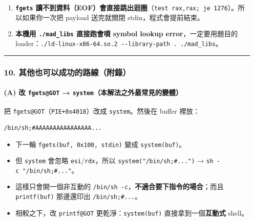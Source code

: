 \documentclass[10pt,a4paper]{article}
\providecommand{\tightlist}{%
  \setlength{\itemsep}{0pt}\setlength{\parskip}{0pt}}
\begin{document}
\begin{enumerate}
  自檢）。
\item
  \textbf{\texttt{fgets}
  讀不到資料（EOF）會直接跳出迴圈}（\texttt{test\ \allowbreak{}rax,\allowbreak{}rax;\ \allowbreak{}je\ \allowbreak{}1276}）。所以如果你一次把
  payload 送完就關閉 stdin，程式會提前結束。
\item
  \textbf{本機用 \texttt{./\allowbreak{}mad\_\allowbreak{}libs} 直接跑會噴 symbol lookup
  error}，一定要用題目的
  loader：\texttt{./\allowbreak{}ld-\allowbreak{}linux-\allowbreak{}x86-\allowbreak{}64.\allowbreak{}so.\allowbreak{}2\ \allowbreak{}-\allowbreak{}\/\allowbreak{}-\allowbreak{}library-\allowbreak{}path\ \allowbreak{}.\allowbreak{}\ \allowbreak{}./\allowbreak{}mad\_\allowbreak{}libs}。
\end{enumerate}

\begin{center}\rule{0.5\linewidth}{0.5pt}\end{center}

\subsubsection{10.
其他也可以成功的路線（附錄）}\label{ux5176ux4ed6ux4e5fux53efux4ee5ux6210ux529fux7684ux8defux7ddaux9644ux9304}

\paragraph{\texorpdfstring{(A) 改 \texttt{fgets@GOT} →
\texttt{system}（本解法之外最常見的變體）}{(A) 改 fgets@GOT → system（本解法之外最常見的變體）}}\label{a-ux6539-fgetsgot-systemux672cux89e3ux6cd5ux4e4bux5916ux6700ux5e38ux898bux7684ux8b8aux9ad4}

把 \texttt{fgets@GOT}（\texttt{PIE+0x4018}）改成 \texttt{system}。然後在
buffer 裡放：

\begin{Verbatim}[breaklines=true,breakanywhere=true,breakautoindent=false,fontsize=\fontsize{7.0}{9.5}\selectfont]
/bin/sh;#AAAAAAAAAAAAAAAA...
\end{Verbatim}

\begin{itemize}
\tightlist
\item
  下一輪 \texttt{fgets(buf,\allowbreak{}\ \allowbreak{}0x100,\allowbreak{}\ \allowbreak{}stdin)} 變成 \texttt{system(buf)}。
\item
  但 \texttt{system} 會忽略 \texttt{esi}/\texttt{rdx}，所以
  \texttt{system("/\allowbreak{}bin/\allowbreak{}sh;\#\allowbreak{}...")} → \texttt{sh\ \allowbreak{}-\allowbreak{}c\ \allowbreak{}"/\allowbreak{}bin/\allowbreak{}sh;\#\allowbreak{}..."}。
\item
  這樣只會開一個非互動的
  \texttt{/\allowbreak{}bin/\allowbreak{}sh\ \allowbreak{}-\allowbreak{}c}，\textbf{不適合要下指令的場合}；而且
  \texttt{printf(buf)} 那邊還印出 \texttt{/\allowbreak{}bin/\allowbreak{}sh;\#\allowbreak{}...}。
\item
  相較之下，改 \texttt{printf@GOT} 更乾淨：\texttt{system(buf)}
  直接拿到一個\textbf{互動式} shell。
\end{itemize}
\end{document}
